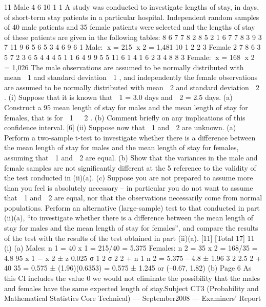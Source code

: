 \documentclass[a4paper,12pt]{article}
\begin{document}
\begin{enumerate}11
Male
4
6
10
1
1
A study was conducted to investigate lengths of stay, in days, of short-term stay
patients in a particular hospital. Independent random samples of 40 male patients and
35 female patients were selected and the lengths of stay of these patients are given in
the following tables:
8
6
7
7
8
2
8
5
2
1
6
7
7
8
3
9
3
7
11
9
6
5
6
5
3
4
6
9
6
1
Male: x = 215 x 2 = 1,481
10
1
2
2
3
Female
2
7
8
6
3
5
7
2
3
6
5
4
4
4
5
1
1
6
4
9
9
5
5
11
6
1
4
1
6
2
3
4
8
8
3
Female: x = 168 x 2 = 1,026
The male observations are assumed to be normally distributed with mean  1 and
standard deviation  1 , and independently the female observations are assumed to be
normally distributed with mean  2 and standard deviation  2 .
(i)
Suppose that it is known that  1 = 3.0 days and  2 = 2.5 days.
(a) Construct a 95%
mean length of stay for males and the mean length of stay for females,
that is for  1   2 .
(b) Comment briefly on any implications of this confidence interval.
[6]
(ii)
Suppose now that  1 and  2 are unknown.
(a) Perform a two-sample t-test to investigate whether there is a difference
between the mean length of stay for males and the mean length of stay
for females, assuming that  1 and  2 are equal.
(b) Show that the variances in the male and female samples are not
significantly different at the 5%
reference to the validity of the test conducted in (ii)(a).
(c) Suppose you are not prepared to assume more than you feel is
absolutely necessary – in particular you do not want to assume that
 1 and  2 are equal, nor that the observations necessarily come from
normal populations.
Perform an alternative (large-sample) test to that conducted in part
(ii)(a), “to investigate whether there is a difference between the mean
length of stay for males and the mean length of stay for females”, and
compare the results of the test with the results of the test obtained in
part (ii)(a).
[11]
[Total 17]
11
(i)
(a)
Males: n 1 = 40
x 1 = 215/40 = 5.375
Females: n 2 = 35 x 2 = 168/35 = 4.8
95%
x 1 − x 2 ± z 0.025
σ 1 2 σ 2 2
+
n 1 n 2
= 5.375 – 4.8 ± 1.96
3 2 2.5 2
+
40 35
= 0.575 ± (1.96)(0.6353)
= 0.575 ± 1.245 or (–0.67, 1.82)
(b)
Page 6
As this CI includes the value 0 we would not eliminate the possibility
that the males and females have the same expected length of stay.Subject CT3 (Probability and Mathematical Statistics Core Technical) — September2008 — Examiners’ Report

\end{enumerate}
\end{document}
